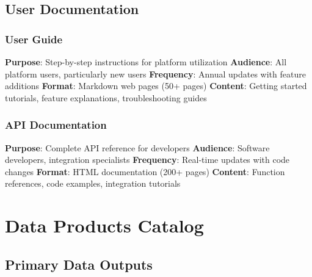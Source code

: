 \documentclass[11pt,a4paper]{article}
\begin{document}
\subsection{User Documentation}

\subsubsection{User Guide}
\begin{itemize}
    \textbf{Purpose}: Step-by-step instructions for platform utilization
    \textbf{Audience}: All platform users, particularly new users
    \textbf{Frequency}: Annual updates with feature additions
    \textbf{Format}: Markdown web pages (50+ pages)
    \textbf{Content}: Getting started tutorials, feature explanations, troubleshooting guides
\end{itemize}

\subsubsection{API Documentation}
\begin{itemize}
    \textbf{Purpose}: Complete API reference for developers
    \textbf{Audience}: Software developers, integration specialists
    \textbf{Frequency}: Real-time updates with code changes
    \textbf{Format}: HTML documentation (200+ pages)
    \textbf{Content}: Function references, code examples, integration tutorials
\end{itemize}

\section{Data Products Catalog}

\subsection{Primary Data Outputs}
\end{document}
